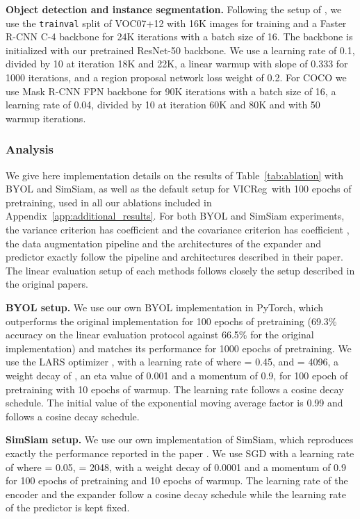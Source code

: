 \documentclass{article}
\newcommand{\algo}{VICReg}
\begin{document}
\textbf{Object detection and instance segmentation.} Following the setup of \cite{he2020moco, zbontar2021barlow}, we use the \texttt{trainval} split of VOC07+12 with 16K images for training and a Faster R-CNN C-4 backbone for 24K iterations with a batch size of 16. The backbone is initialized with our pretrained ResNet-50 backbone. We use a learning rate of 0.1, divided by 10 at iteration 18K and 22K, a linear warmup with slope of 0.333 for 1000 iterations, and a region proposal network loss weight of 0.2. For COCO we use Mask R-CNN FPN backbone for 90K iterations with a batch size of 16, a learning rate of 0.04, divided by 10 at iteration 60K and 80K and with 50 warmup iterations.

\subsubsection{Analysis} \label{app:ablation}

We give here implementation details on the results of Table~\ref{tab:ablation} with BYOL and SimSiam, as well as the default setup for \algo \ with 100 epochs of pretraining, used in all our ablations included in Appendix~\ref{app:additional_results}. For both BYOL and SimSiam experiments, the variance criterion has coefficient  and the covariance criterion has coefficient , the data augmentation pipeline and the architectures of the expander and predictor exactly follow the pipeline and architectures described in their paper. The linear evaluation setup of each methods follows closely the setup described in the original papers.

\textbf{BYOL setup.} We use our own BYOL implementation in PyTorch, which outperforms the original implementation for 100 epochs of pretraining (69.3\% accuracy on the linear evaluation protocol against 66.5\% for the original implementation) and matches its performance for 1000 epochs of pretraining. We use the LARS optimizer \cite{you2017lars}, with a learning rate of  where  = 0.45, and  = 4096, a weight decay of , an eta value of 0.001 and a momentum of 0.9, for 100 epoch of pretraining with 10 epochs of warmup. The learning rate follows a cosine decay schedule. The initial value of the exponential moving average factor is 0.99 and follows a cosine decay schedule. 

\textbf{SimSiam setup.} We use our own implementation of SimSiam, which reproduces exactly the performance reported in the paper \cite{chen2020simsiam}. We use SGD with a learning rate of  where  = 0.05,  = 2048, with a weight decay of 0.0001 and a momentum of 0.9 for 100 epochs of pretraining and 10 epochs of warmup. The learning rate of the encoder and the expander follow a cosine decay schedule while the learning rate of the predictor is kept fixed.
\end{document}
